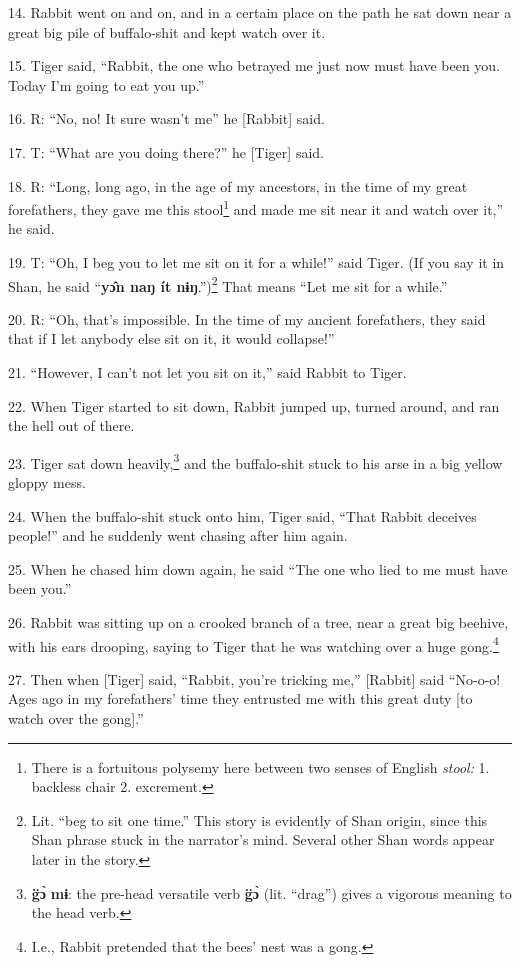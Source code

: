 14. Rabbit went on and on, and in a certain place on the path he
sat down near a great big pile of buffalo-shit and kept watch over it.

15. Tiger said, ``Rabbit, the one who betrayed me just now must have been you.
Today I'm going to eat you up.''

16. R: ``No, no! It sure wasn't me'' he [Rabbit] said.

17. T: ``What are you doing there?'' he [Tiger] said.

18. R: ``Long, long ago, in the age of my ancestors, in the time of my
great forefathers, they gave me this stool\footnote{There is a fortuitous polysemy here between two senses of English \textit{stool: }1. backless chair 2. excrement.} and made me sit near it and watch
over it,'' he said.

19. T: ``Oh, I beg you to let me sit on it for a while!'' said Tiger. (If you say
it in Shan, he said ``\textbf{yɔ̂n naŋ ít nɨŋ}.'')\footnote{Lit. ``beg to sit one time.'' This story is evidently of Shan origin, since this Shan phrase stuck in the narrator's mind. Several other Shan words appear later in the story.} That means ``Let me
sit for a while.''

20. R: ``Oh, that's impossible. In the time of my ancient forefathers, they said
that if I let anybody else sit on it, it would collapse!''

21. ``However, I can't not let you sit on it,'' said Rabbit to Tiger.

22. When Tiger started to sit down, Rabbit jumped up, turned around, and ran the
hell out of there.

23. Tiger sat down heavily,\footnote{\textbf{g̈ɔ̀} \textbf{mɨ}: the pre-head versatile verb \textbf{g̈ɔ̀} (lit. ``drag'') gives a vigorous meaning to the head verb.} and the buffalo-shit stuck to his arse in a big
yellow gloppy mess.

24. When the buffalo-shit stuck onto him, Tiger said, ``That Rabbit deceives people!''
and he suddenly went chasing after him again.

25. When he chased him down again, he said ``The one who lied to me must have been
you.''

26. Rabbit was sitting up on a crooked branch of a tree, near a great big beehive,
with his ears drooping, saying to Tiger that he was watching over a huge gong.\footnote{I.e., Rabbit pretended that the bees' nest was a gong.}

27. Then when [Tiger] said, ``Rabbit, you're tricking me,'' [Rabbit] said ``No-o-o!
Ages ago in my forefathers' time they entrusted me with this great duty [to watch
over the gong].''

